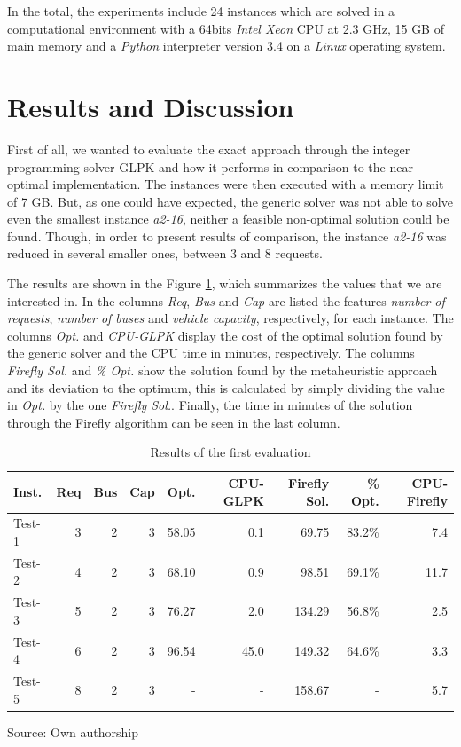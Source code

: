 \documentclass[tuberlin,cic,tc,openright,english,noabntcite,oneside]{iiufrgs}
\begin{document}
In the total, the experiments include 24 instances which are solved in a computational environment with a 64bits \emph{Intel Xeon} CPU at 2.3 GHz, 15 GB of main memory and a \emph{Python} interpreter version 3.4 on a \emph{Linux} operating system.

\section{Results and Discussion}
First of all, we wanted to evaluate the exact approach through the integer programming solver GLPK and how it performs in comparison to the near-optimal implementation. The instances were then executed with a memory limit of 7 GB. But, as one could have expected, the generic solver was not able to solve even the smallest instance \emph{a2-16}, neither a feasible non-optimal solution could be found. Though, in order to present results of comparison, the instance \emph{a2-16} was reduced in several smaller ones, between 3 and 8 requests.

The results are shown in the Figure \ref{tab:evaluation-1}, which summarizes the values that we are interested in. In the columns \emph{Req}, \emph{Bus} and \emph{Cap} are listed the features \emph{number of requests}, \emph{number of buses} and \emph{vehicle capacity}, respectively, for each instance. The columns \emph{Opt.} and \emph{CPU-GLPK} display the cost of the optimal solution found by the generic solver and the CPU time in minutes, respectively. The columns \emph{Firefly Sol.} and \emph{\% Opt.} show the solution found by the metaheuristic approach and its deviation to the optimum, this is calculated by simply dividing the value in \emph{Opt.} by the one \emph{Firefly Sol.}. Finally, the time in minutes of the solution through the Firefly algorithm can be seen in the last column.
\begin{table}[H]
\centering
\caption{Results of the first evaluation}
\begin{tabular}{l | r | r | r | r | r | r | r | r}
\hline
Inst. & Req & Bus & Cap & Opt. & CPU-GLPK & Firefly Sol. & \% Opt. & CPU-Firefly\\
\hline
Test-1 & 	3 & 	2 & 	3 & 	58.05 & 	0.1 & 	69.75 & 	83.2\% & 	7.4 \\
Test-2 & 	4 & 	2 & 	3 & 	68.10 & 	0.9 & 	98.51 & 	69.1\% & 	11.7 \\
Test-3 & 	5 & 	2 & 	3 & 	76.27 & 	2.0 & 	134.29 & 	56.8\% & 	2.5 \\
Test-4 & 	6 & 	2 & 	3 & 	96.54 & 	45.0 & 	149.32 & 	64.6\% & 	3.3 \\
Test-5 & 	8 & 	2 & 	3 & 	- & 	- & 	158.67 & 	- & 	5.7 \\
\hline
\end{tabular}
\center Source: Own authorship
\label{tab:evaluation-1}
\end{table}
\end{document}
